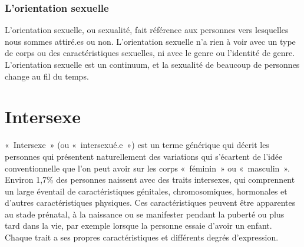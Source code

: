\documentclass[12pt,openany]{book}
\begin{document}
\subsubsection*{L’orientation sexuelle} 

\noindent L’orientation sexuelle, ou sexualité, fait référence aux personnes vers lesquelles nous sommes attiré.es ou non. L’orientation sexuelle n’a rien à voir avec un type de corps ou des caractéristiques sexuelles, ni avec le genre ou l’identité de genre. L’orientation sexuelle est un continuum, et la sexualité de beaucoup de personnes change au fil du temps.

\begin{figure}[h]
    \centering
\end{figure}

\section*{Intersexe}

\noindent \mbox{« Intersexe »} (ou \mbox{« intersexué.e »}) est un terme générique qui décrit les personnes qui présentent naturellement des variations qui s’écartent de l’idée conventionnelle que l’on peut avoir sur les corps \mbox{« féminin »} ou \mbox{« masculin »}. Environ 1,7\% des personnes naissent avec des traits intersexes, qui comprennent un large éventail de caractéristiques génitales, chromosomiques, hormonales et d’autres caractéristiques physiques. Ces caractéristiques peuvent être apparentes au stade prénatal, à la naissance ou se manifester pendant la puberté ou plus tard dans la vie, par exemple lorsque la personne essaie d’avoir un enfant. Chaque trait a ses propres caractéristiques et différents degrés d’expression.
\end{document}
